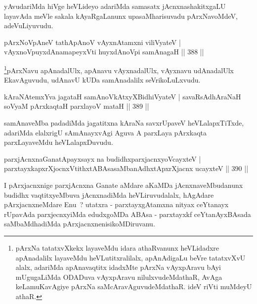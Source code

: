 \begin{artha}
yAvudariMda hiVge heVLideyo adariMda samasatx jAcnxnashakitxgaLU layavAda meVle sakala kAyaRgaLanunx upasaMharisuvadu pArxNavoMdeV, adeV\break uLiyuvudu.
\end{artha}


\begin{shl}
pArxNoV\s pAneV tathA\s pAnoV vAyxnAtamxni viliVyateV |
vAyxnoV\s puyxdAnamapeyxVti huyxdAnoV\s pi samAnagaH \hfill || 388 ||
\end{shl}

\begin{artha}
\footnote{pArxNa tatatxvXkekx layaveMdu idara athaRvanunx heVLidadxre apAnadalilx layaveMdu heVLutitxralilalx, apAnAdigaLu beVre tatatxvXvU alalx, adariMda apAnavaqtitx idadxMte pArxNa vAyxpAravu bAyi mUgugaLiMda ODADuva vAyxpAravu nilulxvudeMdathaR, AvAga keLamuKavAgiye pArxNa saMcAravAguvudeMdathaR. ideV riVti muMdeyU athaR.}pArxNavu apAnadalUlx, apAnavu vAyxnadalUlx, vAyxnavu udAnadalUlx EkavAguvudu, udAnavU kUDa samAnadalilx seVrikoLuLxvudu.
\end{artha}


\begin{shl}
kAraNAtemxYva jagataH samAnoVkAtxyX\s BidhiVyateV |
savaRsAdhAraNaH soV\s yaM pArxkaqtaH parxlayoV mataH \hfill || 389 ||
\end{shl}

\begin{artha}
samAnaveMba padadiMda jagatitxna kAraNa savxrUpaveV heVLalapxTiTxde, adariMda elalxrigU sAmAnayxvAgi Aguva A parxLaya pArxkaqta parxLayaveMdu heVLalapxDuvudu.
\end{artha}


\begin{shl}
parxjAcnxnaGanatA\s payxsayx na budidhxparxjacnxyoVcayxteV |
parxtayxkapxrXjocnxVtithxtABAsasaMbanAdhxtApxrXjacnx ucayxteV \hfill || 390 ||
\end{shl}

\begin{artha}
I pArxjacnxnige parxjAcnxna Ganate aMdare aKaMDa jAcnxnaveMbudanunx budidhx vaqtitxyeMbuva jAcnxnadiMda heVLiruvudalalx, hAgAdare pArxjacnxneMdare Enu~? utatxra - parxtayxgAtamxna nityax ceYtanayx rUpavAda parxjecnxyiMda edudxgoMDa ABAsa - parxtayxkf ceYtanAyxBAsada saMbaMdhadiMda pArxjacnxnenisikoMDiruvanu.
\end{artha}

